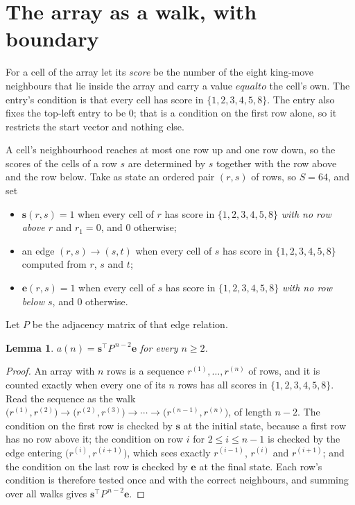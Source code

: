 \documentclass[11pt,a4paper]{article}
\theoremstyle{plain}
\newtheorem{lemma}[theorem]{Lemma}
\theoremstyle{definition}
\begin{document}
\section{The array as a walk, with boundary}

For a cell of the array let its \emph{score} be the number of the eight king-move neighbours that lie inside
the array and carry a value $equal to$ the cell's own. The entry's condition is that every cell
has score in $\{1,2,3,4,5,8\}$. The entry also fixes the top-left entry to be $0$; that is a condition on the first row alone, so it restricts the start vector and nothing else.

A cell's neighbourhood reaches at most one row up and one row down, so the scores of the
cells of a row $s$ are determined by $s$ together with the row above and the row below.
Take as state an ordered pair $(r,s)$ of rows, so $S=64$, and set
\begin{itemize}
\item $\mathbf{s}(r,s)=1$ when every cell of $r$ has score in $\{1,2,3,4,5,8\}$ \emph{with no row
above $r$} and $r_1=0$, and $0$ otherwise;
\item an edge $(r,s)\to(s,t)$ when every cell of $s$ has score in $\{1,2,3,4,5,8\}$ computed from
$r$, $s$ and $t$;
\item $\mathbf{e}(r,s)=1$ when every cell of $s$ has score in $\{1,2,3,4,5,8\}$ \emph{with no row
below $s$}, and $0$ otherwise.
\end{itemize}
Let $P$ be the adjacency matrix of that edge relation.

\begin{lemma}\label{lem:walk}
$a(n)=\mathbf{s}^{\!\top}P^{\,n-2}\mathbf{e}$ for every $n\ge2$.
\end{lemma}

\begin{proof}
An array with $n$ rows is a sequence $r^{(1)},\dots,r^{(n)}$ of rows, and it is counted
exactly when every one of its $n$ rows has all scores in $\{1,2,3,4,5,8\}$. Read the sequence as the
walk $\bigl(r^{(1)},r^{(2)}\bigr)\to\bigl(r^{(2)},r^{(3)}\bigr)\to\cdots\to
\bigl(r^{(n-1)},r^{(n)}\bigr)$, of length $n-2$. The condition on the first row is
checked by $\mathbf{s}$ at the initial state, because a first row has no row above it; the
condition on row $i$ for $2\le i\le n-1$ is checked by the edge entering
$\bigl(r^{(i)},r^{(i+1)}\bigr)$, which sees exactly $r^{(i-1)}$, $r^{(i)}$ and
$r^{(i+1)}$; and the condition on the last row is checked by $\mathbf{e}$ at the final
state. Each row's condition is therefore tested once and with the correct neighbours, and
summing over all walks gives $\mathbf{s}^{\!\top}P^{\,n-2}\mathbf{e}$.
\end{proof}
\end{document}
